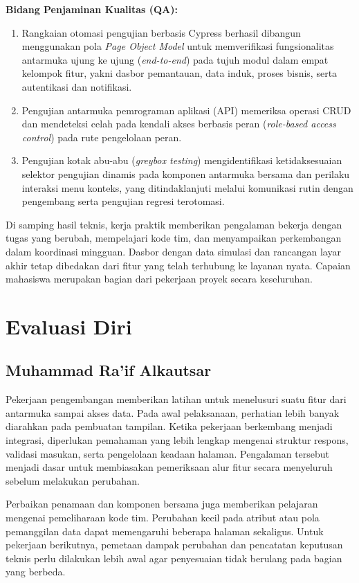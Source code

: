 \noindent\textbf{Bidang Penjaminan Kualitas (QA):}
\begin{enumerate}[label=\arabic*),resume]
\item Rangkaian otomasi pengujian berbasis Cypress berhasil dibangun menggunakan pola \textit{Page Object Model} untuk memverifikasi fungsionalitas antarmuka ujung ke ujung (\textit{end-to-end}) pada tujuh modul dalam empat kelompok fitur, yakni dasbor pemantauan, data induk, proses bisnis, serta autentikasi dan notifikasi.
\item Pengujian antarmuka pemrograman aplikasi (API) memeriksa operasi CRUD dan mendeteksi celah pada kendali akses berbasis peran (\textit{role-based access control}) pada rute pengelolaan peran.
\item Pengujian kotak abu-abu (\textit{greybox testing}) mengidentifikasi ketidaksesuaian selektor pengujian dinamis pada komponen antarmuka bersama dan perilaku interaksi menu konteks, yang ditindaklanjuti melalui komunikasi rutin dengan pengembang serta pengujian regresi terotomasi.
\end{enumerate}

Di samping hasil teknis, kerja praktik memberikan pengalaman bekerja dengan tugas yang berubah, mempelajari kode tim, dan menyampaikan perkembangan dalam koordinasi mingguan. Dasbor dengan data simulasi dan rancangan layar akhir tetap dibedakan dari fitur yang telah terhubung ke layanan nyata. Capaian mahasiswa merupakan bagian dari pekerjaan proyek secara keseluruhan.

\section{Evaluasi Diri}
\subsection{Muhammad Ra'if Alkautsar}
Pekerjaan pengembangan memberikan latihan untuk menelusuri suatu fitur dari antarmuka sampai akses data. Pada awal pelaksanaan, perhatian lebih banyak diarahkan pada pembuatan tampilan. Ketika pekerjaan berkembang menjadi integrasi, diperlukan pemahaman yang lebih lengkap mengenai struktur respons, validasi masukan, serta pengelolaan keadaan halaman. Pengalaman tersebut menjadi dasar untuk membiasakan pemeriksaan alur fitur secara menyeluruh sebelum melakukan perubahan.

Perbaikan penamaan dan komponen bersama juga memberikan pelajaran mengenai pemeliharaan kode tim. Perubahan kecil pada atribut atau pola pemanggilan data dapat memengaruhi beberapa halaman sekaligus. Untuk pekerjaan berikutnya, pemetaan dampak perubahan dan pencatatan keputusan teknis perlu dilakukan lebih awal agar penyesuaian tidak berulang pada bagian yang berbeda.

